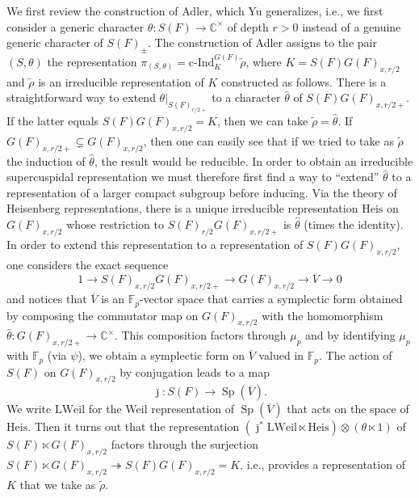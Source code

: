 \documentclass{article}
\def\tx#1{\textrm{#1}}
\def\C{\mathbb{C}}
\def\ol#1{\overline{#1}}
\def\hat{\widehat}
\newcommand{\bF}{\mathbb{F}}
\newcommand{\bC}{\mathbb{C}}
\DeclareMathOperator{\Sp}{Sp}
\theoremstyle{definition}
\numberwithin{equation}{subsection}
\renewcommand{\-}{\hyp{}}
\newcommand{\oV}{\ol{V}}
\begin{document}
We first review the construction of Adler, which Yu generalizes, i.e., we first consider a generic character $\theta : S(F) \to \C^\times$ of depth $r>0$ instead of a genuine generic character of $S(F)_{\pm}$. The construction of Adler assigns to the pair $(S,\theta)$ the representation $\pi_{(S,\theta)}=\tx{c-Ind}_K^{G(F)}\tilde\rho$, where $K=S(F)G(F)_{x,r/2}$ and $\tilde\rho$ is an irreducible representation of $K$ constructed as follows. There is a straightforward way to extend $\theta|_{S(F)_{r/2+}}$ to a character $\hat\theta$ of $S(F)G(F)_{x,r/2+}$. If the latter equals $S(F)G(F)_{x,r/2}=K$, then we can take $\tilde\rho=\hat \theta$. If $G(F)_{x,r/2+} \subsetneq G(F)_{x,r/2}$, then one can easily see that if we tried to take as $\tilde\rho$ the induction of $\hat\theta$, the result would be reducible. In order to obtain an irreducible supercuspidal representation we must therefore first find a way to ``extend'' $\hat \theta$ to a representation of a larger compact subgroup before inducing.
Via the theory of Heisenberg representations, there is a unique irreducible representation $\mathrm{Heis}$ on $G(F)_{x,r/2}$ whose restriction to $S(F)_{r/2}G(F)_{x,r/2+}$ is $\hat \theta$ (times the identity). In order to extend this representation to a representation of $S(F)G(F)_{x,r/2}$, one considers the  exact sequence
\[ 1 \to S(F)_{x,r/2}G(F)_{x,r/2+} \to G(F)_{x,r/2} \to \oV \to 0 \]
and notices that $\oV$ is an $\bF_p$-vector space that carries a symplectic form obtained by composing the commutator map on $G(F)_{x,r/2}$ with the homomorphism $\hat \theta : G(F)_{x,r/2+} \to \bC^\times$. This composition factors through $\mu_p$ and by identifying $\mu_p$ with $\bF_p$ (via $\psi$), we obtain a symplectic form on $\oV$ valued in $\bF_p$. 
The action of $S(F)$ on $G(F)_{x,r/2}$ by conjugation leads to a map 
\begin{equation} \label{eq:ad1}
	\bar\jmath : S(F) \rightarrow \Sp(\ol{V}).
\end{equation}
We write $\mathrm{LWeil}$ for the Weil representation of $\Sp(\ol{V})$ that acts on the space of $\mathrm{Heis}$. Then it turns out that the representation $(\bar\jmath^*\mathrm{LWeil}\ltimes \mathrm{Heis})\otimes (\theta \ltimes 1)$ of $S(F) \ltimes G(F)_{x,r/2}$ factors through the surjection $S(F) \ltimes G(F)_{x,r/2} \twoheadrightarrow S(F)G(F)_{x,r/2}=K$, i.e., provides a representation of $K$ that we take as $\tilde \rho$.
\end{document}
